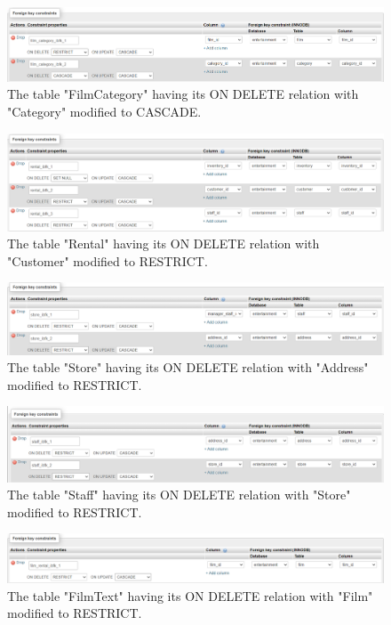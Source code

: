 \documentclass{article}
\begin{document}
		\begin{figure}[H]
			\includegraphics[width=\textwidth]{category_cascade}
			\caption{The table "Film\textunderscore Category" having its ON DELETE relation with "Category" modified to CASCADE.}
		\end{figure}
		\begin{figure}[H]
			\includegraphics[width=\textwidth]{customer_restrict}
			\caption{The table "Rental" having its ON DELETE relation with "Customer" modified to RESTRICT.}
		\end{figure}
		\begin{figure}[H]
			\includegraphics[width=\textwidth]{address_restrict}
			\caption{The table "Store" having its ON DELETE relation with "Address" modified to RESTRICT.}
		\end{figure}
		\begin{figure}[H]
			\includegraphics[width=\textwidth]{store_restrict}
			\caption{The table "Staff" having its ON DELETE relation with "Store" modified to RESTRICT.}
		\end{figure}
		\begin{figure}[H]
			\includegraphics[width=\textwidth]{film_restrict}
			\caption{The table "Film\textunderscore Text" having its ON DELETE relation with "Film" modified to RESTRICT.}
		\end{figure}
\end{document}
